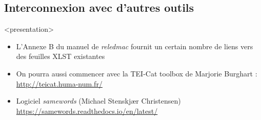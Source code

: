 \documentclass[transnotheorems,noamsthm]{beamer}
\newenvironment{slide}{%
  \begin{frame}
  <presentation>\mode<presentation>{\frametitle{\insertsubsection}}%
  }%
  {\end{frame}}
\newcommand{\package}[1]{\emph{#1}}
\begin{document}
\subsection{Interconnexion avec d'autres outils}
\begin{slide}
  \begin{itemize}
    \item L'Annexe B du manuel de \package{reledmac} fournit un certain nombre de liens vers des feuilles XLST existantes
    \item On pourra aussi commencer avec la TEI-Cat toolbox de Marjorie Burghart : \url{http://teicat.huma-num.fr/}
    \item Logiciel \package{samewords} (Michael Stenskjær Christensen)  \\
 \url{https://samewords.readthedocs.io/en/latest/}
  \end{itemize}
\end{slide}
\end{document}
